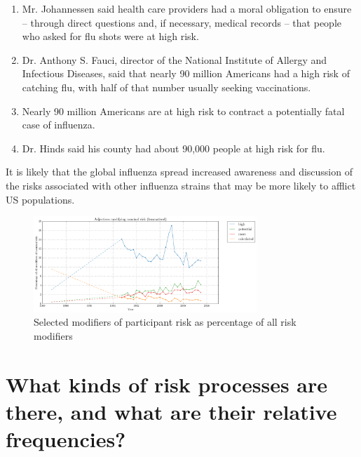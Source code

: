                 \begin{enumerate}   [before=\itshape,font=\normalfont] \setlength\itemsep{0em} \small
                    \item Mr. Johannessen said health care providers had a moral obligation to ensure -- through direct questions and, if necessary, medical records -- that people who asked for flu shots were at high risk. 
                    \item Dr. Anthony S. Fauci, director of the National Institute of Allergy and Infectious Diseases, said that nearly 90 million Americans had a high risk of catching flu, with half of that number usually seeking vaccinations. 
                    \item Nearly 90 million Americans are at high risk to contract a potentially fatal case of influenza. 
                    \item Dr. Hinds said his county had about 90,000 people at high risk for flu. 
                \end{enumerate}
                It is likely that the global influenza spread increased awareness and discussion of the risks associated with other influenza strains that may be more likely to afflict US populations. 

                

				\begin{figure}%
				\centering
				\includegraphics[width=0.75\textwidth]{../images/adjectives_modifying_nominal_risk_(lemmatised).png}
				\caption{Selected modifiers of participant risk as percentage of all risk modifiers}
				\label{fig:reladjrisk}
				\end{figure}


		\section{What kinds of risk processes are there, and what are their relative frequencies?}
		\FloatBarrier

